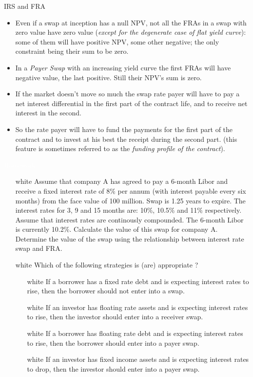 \documentclass{beamer}
\begin{document}
\begin{frame}{IRS and FRA}
	\begin{itemize}
		\item<1-> Even if a swap at inception has a null NPV, not all the FRAs in a swap with zero value have zero value (\emph{except for the degenerate case of flat yield curve}): some of them will have positive NPV, some other negative; the only constraint being their sum to be zero.
		\item<2-> In a \emph{Payer Swap} with an increasing yield curve the first FRAs will have negative value, the last positive. Still their NPV's sum is zero.
		\item<3-> If the market doesn't move so much the swap rate payer will have to pay a net interest differential in the first part of the contract life, and to receive net interest in the second.
		\item<4-> So the rate payer will have to fund the payments for the first part of the contract and to invest at his best the receipt during the second part. (this feature is sometimes referred to as the \emph{funding profile of the contract}).
	\end{itemize}
\end{frame}

\begin{homework}
\begin{frame}{\textcolor{white}{Homework}}
\begin{itemize}
\item[white] Assume that company A has agreed to pay a 6-month Libor and receive a fixed interest rate of 8\% per annum (with interest payable every six months) from the face value of 100 million. Swap is 1.25 years to expire. The interest rates for 3, 9 and 15 months are: 10\%, 10.5\% and 11\% respectively. Assume that interest rates are continously compounded. The 6-month Libor is currently 10.2\%. Calculate the value of this swap for company A. Determine the value of the swap using the relationship between interest rate swap and FRA.
\item[white] Which of the following strategies is (are) appropriate ?
\small{
\begin{itemize}
	\item[white] If a borrower has a fixed rate debt and is expecting interest rates to rise, then the borrower should not enter into a swap.
	\item[white] If an investor has floating rate assets and is expecting interest rates to rise, then the investor should enter into a receiver swap.
	\item[white] If a borrower has floating rate debt and is expecting interest rates to rise, then the borrower should enter into a payer swap.
	\item[white] If an investor has fixed income assets and is expecting interest rates to drop, then the investor should enter into a payer swap.
\end{itemize}}
\end{itemize}
\end{frame}
\end{homework}
\end{document}
